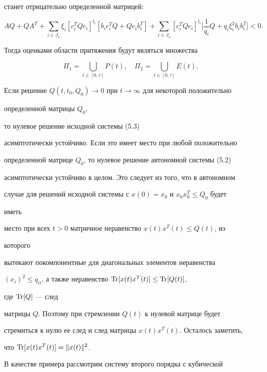 станет отрицательно определенной матрицей: 


$$ 


A Q+Q A^T+\sum_{i\in J_1}\xi_i[c^T_i Q c_i]^{l_i} 


[b_i c^T_i Q+Q c_i b^T_i]+\sum_{i\in J_2} 


[c^T_i Q c_i]^{l_i}\bigg[\frac{1}{q_i}Q+q_i 


\xi^2_i b_i b^T_i]<0. 


$$ 


Тогда оценками области притяжения будут являться множества 


$$ 


\Pi_1=\bigcup_{t\in[0,\tau]}P(t),\quad 


\Pi_2=\bigcup_{t\in[0,\tau]}E(t). 


$$ 


 


Если решение $Q(t,t_0,Q_0)\to0$ при $t\to\infty$ для некоторой положительно 


определенной матрицы $Q_0$, 


то нулевое решение исходной системы (5.3)


асимптотически устойчиво. Если это имеет место при любой положительно 


определенной матрице $Q_0$, то нулевое решение автономной системы (5.2) 


асимптотически устойчиво в целом. Это следует из того, что в автономном 


случае для решений исходной системы с $x(0)=x_0$ и $x_0x_0^T\le Q_0$ будет 


иметь 


место при всех $t>0$ матричное неравенство $x(t)x^T(t)\le Q(t)$, из 


которого 


вытекают покомпонентные для диагональных элементов неравенства 


$(x_i)^2\le q_{ii}$, а также неравенство $\operatorname{Tr}[x(t)x^T(t)]\le\operatorname{Tr}[Q(t)]$, 


где $\operatorname{Tr}[Q]$ --- след 


матрицы $Q$. Поэтому при стремлении $Q(t)$ к нулевой матрице будет 


стремиться к нулю ее след и след матрицы $x(t)x^T(t)$. Осталось заметить, 


что $\operatorname{Tr}[x(t)x^T(t)]=\|x(t)\|^2$. 


 


В качестве примера рассмотрим систему второго порядка с кубической 


